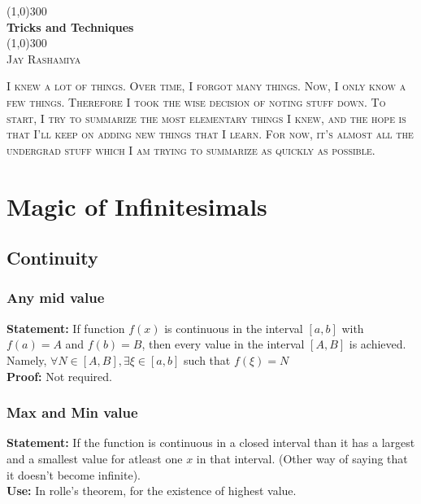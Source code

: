 \documentclass{report}
\author{Jay Rashamiya}
\begin{document}
\begin{titlepage}
  \begin{center}
  \line(1,0){300}\\
  \huge{\bfseries Tricks and Techniques}\\
  \line(1,0){300}\\
  \textsc{\LARGE Jay Rashamiya}\\
  \vspace{5cm}
  \end{center}

  \noindent \textsc{\large I knew a lot of things. Over time, I forgot many things. Now, I only know a few things. Therefore I took the wise decision of noting stuff down. To start, I try to summarize the most elementary things I knew, and the hope is that I'll keep on adding new things that I learn. For now, it's almost all the undergrad stuff which I am trying to summarize as quickly as possible.}
\end{titlepage}

\chapter{Magic of Infinitesimals}
\section{Continuity}
\subsection{Any mid value}
\textbf{Statement:} If function $f(x)$ is continuous in the interval $[a,b]$ with $f(a) = A$ and $f(b) = B$, then every value in the interval $[A,B]$ is achieved. Namely, $\forall N \in [A,B], \exists \xi \in [a,b]$ such that $f(\xi) = N$ \\

\noindent\textbf{Proof:} Not required.

\subsection{Max and Min value}
\textbf{Statement:} If the function is continuous in a closed interval than it has a largest and a smallest value for atleast one $x$ in that interval. (Other way of saying that it doesn't become infinite). \\

\noindent\textbf{Use:} In rolle's theorem, for the existence of highest value.
\end{document}
